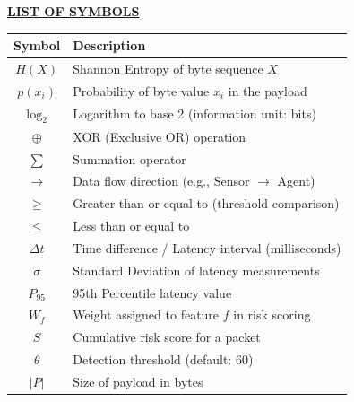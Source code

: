 {\centering
	\par
	\large \textbf{\underline{LIST OF SYMBOLS}} \par
}\vspace{0.7cm}

\begin{table}[h]
\centering
\renewcommand{\arraystretch}{1.5}
\begin{tabular}{|c|l|}
\hline
\textbf{Symbol} & \textbf{Description} \\
\hline
$H(X)$ & Shannon Entropy of byte sequence $X$ \\
\hline
$p(x_i)$ & Probability of byte value $x_i$ in the payload \\
\hline
$\log_2$ & Logarithm to base 2 (information unit: bits) \\
\hline
$\oplus$ & XOR (Exclusive OR) operation \\
\hline
$\sum$ & Summation operator \\
\hline
$\rightarrow$ & Data flow direction (e.g., Sensor $\rightarrow$ Agent) \\
\hline
$\geq$ & Greater than or equal to (threshold comparison) \\
\hline
$\leq$ & Less than or equal to \\
\hline
$\Delta t$ & Time difference / Latency interval (milliseconds) \\
\hline
$\sigma$ & Standard Deviation of latency measurements \\
\hline
$P_{95}$ & 95th Percentile latency value \\
\hline
$W_f$ & Weight assigned to feature $f$ in risk scoring \\
\hline
$S$ & Cumulative risk score for a packet \\
\hline
$\theta$ & Detection threshold (default: 60) \\
\hline
$|P|$ & Size of payload in bytes \\
\hline
\end{tabular}
\end{table}
